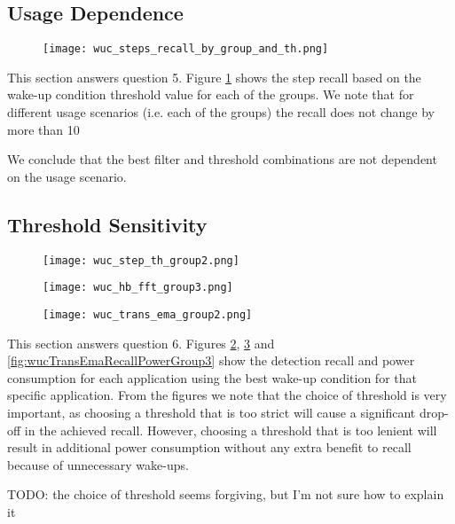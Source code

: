 \subsection{Usage Dependence}

\begin{figure}[h]
	\texttt{[image: wuc\_steps\_recall\_by\_group\_and\_th.png]}
	\caption{}
    \label{fig:wucStepsRecallByGroupAndThreshold}
\end{figure}

This section answers question 5. Figure \ref{fig:wucStepsRecallByGroupAndThreshold} shows the step recall based on the wake-up condition threshold value for each of the groups. We note that for different usage scenarios (i.e. each of the groups) the recall does not change by more than 10%

We conclude that the best filter and threshold combinations are not dependent on the usage scenario.


\subsection{Threshold Sensitivity}

\begin{figure}[h]
	\texttt{[image: wuc\_step\_th\_group2.png]}
	\caption{}
    \label{fig:wucStepThRecallPowerGroup2}
\end{figure}

\begin{figure}[h]
	\texttt{[image: wuc\_hb\_fft\_group3.png]}
	\caption{}
    \label{fig:wucHbFftRecallPowerGroup3}
\end{figure}

\begin{figure}[h]
	\texttt{[image: wuc\_trans\_ema\_group2.png]}
	\caption{}
    \label{fig:wucTransEmaRecallPowerGroup2}
\end{figure}


This section answers question 6. Figures \ref{fig:wucStepThRecallPowerGroup2}, \ref{fig:wucHbFftRecallPowerGroup3} and \ref{fig:wucTransEmaRecallPowerGroup3} show the detection recall and power consumption for each application using the best wake-up condition for that specific application. From the figures we note that the choice of threshold is very important, as choosing a threshold that is too strict will cause a significant drop-off in the achieved recall. However, choosing a threshold that is too lenient will result in additional power consumption without any extra benefit to recall because of unnecessary wake-ups. 

TODO: the choice of threshold seems forgiving, but I'm not sure how to explain it